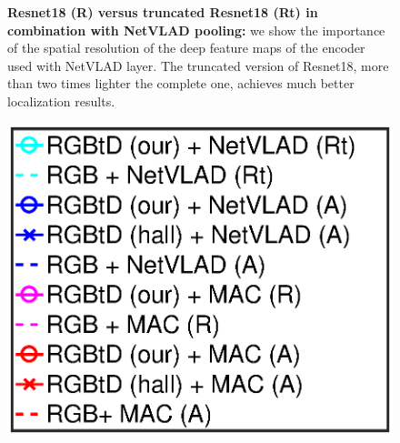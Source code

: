\begin{figure}
\begin{minipage}{0.49\linewidth}
	\end{minipage}
	\caption{\label{fig:trunc_resnet} \textbf{Resnet18 (R) versus truncated Resnet18 (Rt) in combination with NetVLAD pooling:} we show the importance of the spatial resolution of the deep feature maps of the encoder used with NetVLAD layer. The truncated version of Resnet18, more than two times lighter the complete one, achieves much better localization results.}
\end{figure}

\begin{figure}
	\center
	\begin{minipage}{0.14\linewidth}
		\includegraphics[trim={90 140 95 100},clip,width=\linewidth]{plot/fig/legend}	
	\end{minipage}
	\begin{minipage}{0.85\linewidth}
	

\end{minipage}
\end{figure}
